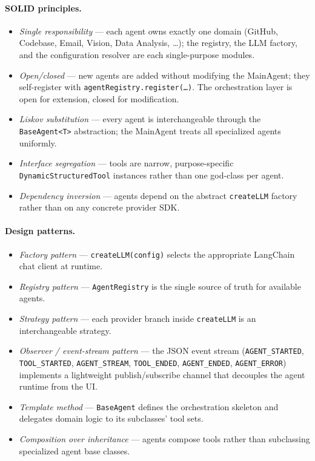 \documentclass[11pt,a4paper]{report}
\newcommand{\code}[1]{\texttt{\small #1}}
\begin{document}
\paragraph{SOLID principles.}
\begin{itemize}
  \item \emph{Single responsibility} --- each agent owns exactly one domain (GitHub, Codebase, Email, Vision, Data Analysis, \ldots); the registry, the LLM factory, and the configuration resolver are each single-purpose modules.
  \item \emph{Open/closed} --- new agents are added without modifying the MainAgent; they self-register with \code{agentRegistry.register(\ldots)}. The orchestration layer is open for extension, closed for modification.
  \item \emph{Liskov substitution} --- every agent is interchangeable through the \code{BaseAgent<T>} abstraction; the MainAgent treats all specialized agents uniformly.
  \item \emph{Interface segregation} --- tools are narrow, purpose-specific \code{DynamicStructuredTool} instances rather than one god-class per agent.
  \item \emph{Dependency inversion} --- agents depend on the abstract \code{createLLM} factory rather than on any concrete provider SDK.
\end{itemize}

\paragraph{Design patterns.}
\begin{itemize}
  \item \emph{Factory pattern} --- \code{createLLM(config)} selects the appropriate LangChain chat client at runtime.
  \item \emph{Registry pattern} --- \code{AgentRegistry} is the single source of truth for available agents.
  \item \emph{Strategy pattern} --- each provider branch inside \code{createLLM} is an interchangeable strategy.
  \item \emph{Observer / event-stream pattern} --- the JSON event stream (\code{AGENT\_STARTED}, \code{TOOL\_STARTED}, \code{AGENT\_STREAM}, \code{TOOL\_ENDED}, \code{AGENT\_ENDED}, \code{AGENT\_ERROR}) implements a lightweight publish/subscribe channel that decouples the agent runtime from the UI.
  \item \emph{Template method} --- \code{BaseAgent} defines the orchestration skeleton and delegates domain logic to its subclasses' tool sets.
  \item \emph{Composition over inheritance} --- agents compose tools rather than subclassing specialized agent base classes.
\end{itemize}
\end{document}
